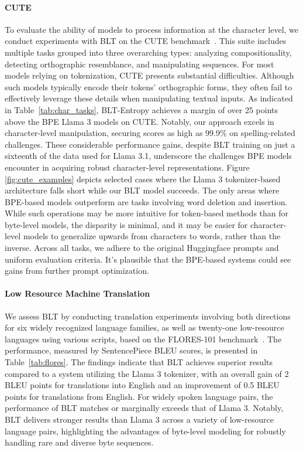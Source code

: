 \paragraph{CUTE}
To evaluate the ability of models to process information at the character level, we conduct experiments with {\textsc BLT} on the CUTE benchmark~\citep{edman2024cute}. This suite includes multiple tasks grouped into three overarching types: analyzing compositionality, detecting orthographic resemblance, and manipulating sequences. For most models relying on tokenization, CUTE presents substantial difficulties. Although such models typically encode their tokens' orthographic forms, they often fail to effectively leverage these details when manipulating textual inputs. As indicated in Table~\ref{tab:char_tasks}, {\textsc BLT}-Entropy achieves a margin of over 25 points above the BPE Llama 3 models on CUTE. Notably, our approach excels in character-level manipulation, securing scores as high as 99.9\% on spelling-related challenges. These considerable performance gains, despite {\textsc BLT} training on just a sixteenth of the data used for Llama 3.1, underscore the challenges BPE models encounter in acquiring robust character-level representations. Figure \ref{fig:cute_examples} depicts selected cases where the Llama 3 tokenizer-based architecture falls short while our {\textsc BLT} model succeeds. The only areas where BPE-based models outperform are tasks involving word deletion and insertion. While such operations may be more intuitive for token-based methods than for byte-level models, the disparity is minimal, and it may be easier for character-level models to generalize upwards from characters to words, rather than the inverse. Across all tasks, we adhere to the original Huggingface prompts and uniform evaluation criteria. It's plausible that the BPE-based systems could see gains from further prompt optimization.

\paragraph{Low Resource Machine Translation} We assess {\textsc BLT} by conducting translation experiments involving both directions for six widely recognized language families, as well as twenty-one low-resource languages using various scripts, based on the FLORES-101 benchmark~\citep{goyal2022flores}. The performance, measured by SentencePiece BLEU scores, is presented in Table~\ref{tab:flores}.
The findings indicate that {\textsc BLT} achieves superior results compared to a system utilizing the Llama 3 tokenizer, with an overall gain of 2 BLEU points for translations into English and an improvement of 0.5 BLEU points for translations from English. For widely spoken language pairs, the performance of {\textsc BLT} matches or marginally exceeds that of Llama 3. Notably, {\textsc BLT} delivers stronger results than Llama 3 across a variety of low-resource language pairs, highlighting the advantages of byte-level modeling for robustly handling rare and diverse byte sequences.

